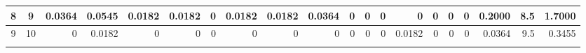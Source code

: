 \begin{table}[ht]
\begin{adjustbox}{width = \textwidth, center}
\begin{tabular}{|cc|r|r|r|r|r|r|r|r|r|r|r|r|r|r|r|rrr|}
        \cellcolor[HTML]{C9DAF8}8            & \cellcolor[HTML]{EBF1FC}9           & \cellcolor[HTML]{BCE4D1}0.0364                 & \cellcolor[HTML]{9BD7B9}0.0545                 & \cellcolor[HTML]{DEF2E8}0.0182                 & \cellcolor[HTML]{DEF2E8}0.0182                 & \cellcolor[HTML]{FFFFFF}0                      & \cellcolor[HTML]{DEF2E8}0.0182                 & \cellcolor[HTML]{DEF2E8}0.0182                 & \cellcolor[HTML]{BCE4D1}0.0364                  & \cellcolor[HTML]{FFFFFF}0                       & \cellcolor[HTML]{FFFFFF}0                       & \cellcolor[HTML]{FFFFFF}0                       & \cellcolor[HTML]{FFFFFF}0                       & \cellcolor[HTML]{FFFFFF}0                       & \cellcolor[HTML]{FFFFFF}0                       & \cellcolor[HTML]{FFFFFF}0                       & \multicolumn{1}{r|}{\cellcolor[HTML]{D9D2E9}0.2000}                                   & \multicolumn{1}{r|}{\cellcolor[HTML]{D9D2E9}8.5}                        & \cellcolor[HTML]{D9D2E9}1.7000                                                              \\ \hline
        \rowcolor[HTML]{FFFFFF} 
        \cellcolor[HTML]{C9DAF8}9            & \cellcolor[HTML]{EBF1FC}10          & 0                                              & \cellcolor[HTML]{DEF2E8}0.0182                 & 0                                              & 0                                              & 0                                              & 0                                              & 0                                              & 0                                               & 0                                               & 0                                               & 0                                               & \cellcolor[HTML]{DEF2E8}0.0182                  & 0                                               & 0                                               & 0                                               & \multicolumn{1}{r|}{\cellcolor[HTML]{D9D2E9}0.0364}                                   & \multicolumn{1}{r|}{\cellcolor[HTML]{D9D2E9}9.5}                        & \cellcolor[HTML]{D9D2E9}0.3455                                                              \\ \hline
        \rowcolor[HTML]{FFFFFF} 

\end{tabular}
\end{adjustbox}
\end{table}
